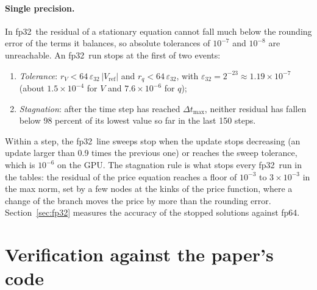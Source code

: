 \documentclass[11pt]{article}
\newcommand{\fpd}{\textsf{fp64}}
\newcommand{\fps}{\textsf{fp32}}
\begin{document}
\paragraph{Single precision.} In \fps\ the residual of a stationary equation cannot fall much below the rounding error of the terms it balances, so absolute tolerances of $10^{-7}$ and $10^{-8}$ are unreachable. An \fps\ run stops at the first of two events:
\begin{enumerate}
\item \emph{Tolerance}: $r_V < 64\,\varepsilon_{32}\,|V_{\mathrm{ref}}|$ and $r_q < 64\,\varepsilon_{32}$, with $\varepsilon_{32}=2^{-23}\approx1.19\times10^{-7}$ (about $1.5\times10^{-4}$ for $V$ and $7.6\times10^{-6}$ for $q$);
\item \emph{Stagnation}: after the time step has reached $\Delta t_{\max}$, neither residual has fallen below 98 percent of its lowest value so far in the last 150 steps.
\end{enumerate}
Within a step, the \fps\ line sweeps stop when the update stops decreasing (an update larger than 0.9 times the previous one) or reaches the sweep tolerance, which is $10^{-6}$ on the GPU. The stagnation rule is what stops every \fps\ run in the tables: the residual of the price equation reaches a floor of $10^{-3}$ to $3\times10^{-3}$ in the max norm, set by a few nodes at the kinks of the price function, where a change of the branch moves the price by more than the rounding error. Section~\ref{sec:fp32} measures the accuracy of the stopped solutions against \fpd.

\section{Verification against the paper's code}
\label{sec:verif}
\end{document}
